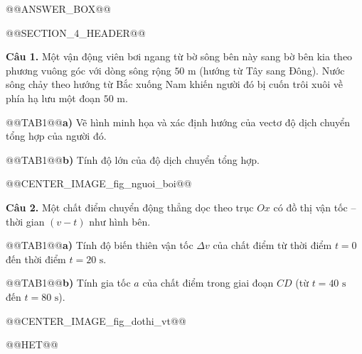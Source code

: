 \documentclass{article}
\begin{document}
@@ANSWER_BOX@@

@@SECTION_4_HEADER@@

\textbf{Câu 1.} Một vận động viên bơi ngang từ bờ sông bên này sang bờ bên kia theo phương vuông góc với dòng sông rộng $50\text{ m}$ (hướng từ Tây sang Đông). Nước sông chảy theo hướng từ Bắc xuống Nam khiến người đó bị cuốn trôi xuôi về phía hạ lưu một đoạn $50\text{ m}$.

@@TAB1@@\textbf{a)} Vẽ hình minh họa và xác định hướng của vectơ độ dịch chuyển tổng hợp của người đó.

@@TAB1@@\textbf{b)} Tính độ lớn của độ dịch chuyển tổng hợp.

@@CENTER_IMAGE_fig_nguoi_boi@@

\textbf{Câu 2.} Một chất điểm chuyển động thẳng dọc theo trục $Ox$ có đồ thị vận tốc -- thời gian $(v - t)$ như hình bên.

@@TAB1@@\textbf{a)} Tính độ biến thiên vận tốc $\Delta v$ của chất điểm từ thời điểm $t = 0$ đến thời điểm $t = 20\text{ s}$.

@@TAB1@@\textbf{b)} Tính gia tốc $a$ của chất điểm trong giai đoạn $CD$ (từ $t = 40\text{ s}$ đến $t = 80\text{ s}$).

@@CENTER_IMAGE_fig_dothi_vt@@



@@HET@@
\end{document}
